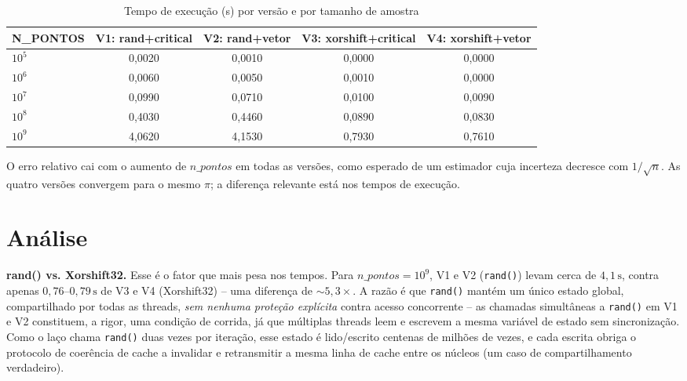 \documentclass[a4paper,12pt]{article}
\begin{document}
\begin{table}[h]
    \centering
    \caption{Tempo de execução (s) por versão e por tamanho de amostra}
    \label{tab:tempos}
    \begin{adjustbox}{width=\textwidth}
        \begin{tabular}{@{}lcccc@{}}
            \toprule
            \textbf{N\_PONTOS} & \textbf{V1: rand+critical} & \textbf{V2: rand+vetor} & \textbf{V3: xorshift+critical} & \textbf{V4: xorshift+vetor} \\
            \midrule
            $10^5$  & 0,0020 & 0,0010 & 0,0000 & 0,0000 \\
            $10^6$  & 0,0060 & 0,0050 & 0,0010 & 0,0000 \\
            $10^7$  & 0,0990 & 0,0710 & 0,0100 & 0,0090 \\
            $10^8$  & 0,4030 & 0,4460 & 0,0890 & 0,0830 \\
            $10^9$  & 4,0620 & 4,1530 & 0,7930 & 0,7610 \\
            \bottomrule
        \end{tabular}
    \end{adjustbox}
\end{table}

O erro relativo cai com o aumento de $n\_pontos$ em todas as versões, como esperado de um estimador cuja
incerteza decresce com $1/\sqrt{n}$. As quatro versões convergem para o mesmo $\pi$; a diferença relevante
está nos tempos de execução.

\section{Análise}

\textbf{rand() vs. Xorshift32.} Esse é o fator que mais pesa nos tempos. Para
$n\_pontos = 10^9$, V1 e V2 (\texttt{rand()}) levam cerca de $4,1\,\text{s}$,
contra apenas $0,76$--$0,79\,\text{s}$ de V3 e V4 (Xorshift32) -- uma diferença
de $\sim 5,3\times$. A razão é que \texttt{rand()} mantém um único estado
global, compartilhado por todas as threads, \emph{sem nenhuma proteção
explícita} contra acesso concorrente -- as chamadas simultâneas a
\texttt{rand()} em V1 e V2 constituem, a rigor, uma condição de corrida,
 já que múltiplas threads leem e escrevem a mesma variável
de estado sem sincronização. Como o laço chama \texttt{rand()} duas vezes por
iteração, esse estado é lido/escrito centenas de milhões de vezes, e cada
escrita obriga o protocolo de coerência de cache a invalidar e retransmitir a
mesma linha de cache entre os núcleos (um caso de compartilhamento verdadeiro).
\end{document}
